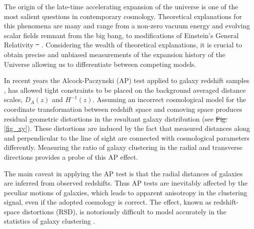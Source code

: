\documentclass[iop]{emulateapj}
\providecommand{\DIFadd}[1]{{\protect\color{blue}\uwave{#1}}} %
\providecommand{\DIFdel}[1]{{\protect\color{red}\sout{#1}}}                      %
\providecommand{\DIFaddbegin}{} %
\providecommand{\DIFaddend}{} %
\providecommand{\DIFdelbegin}{} %
\providecommand{\DIFdelend}{} %
\begin{document}
\DIFaddend The  origin  of  the late-time accelerating  expansion  of  the  universe  is  one of  the  most  salient  questions  in  contemporary cosmology. 
Theoretical explanations for this phenomena are many and range from a non-zero  vacuum energy and evolving  scalar  fields  remnant  from  the  big  bang, 
to modifications of Einstein's General Relativity \DIFdelbegin \DIFdel{\mbox{%
\cite{2012IJMPD..2130002Y}}%
}\DIFdelend \DIFaddbegin \DIFadd{\mbox{%
\citep{2012IJMPD..2130002Y}}%
}\DIFaddend . 
Considering the wealth of theoretical explanations, 
it is crucial to obtain precise and unbiased measurements of the expansion history of the Universe allowing us to 
differentiate between competing models. 

In recent years the Alcock-Paczynski (AP) test \citep{AP1979} applied to galaxy redshift samples \citep{Outram2004,Blake2011,Alam2016}, 
has allowed tight constraints to be placed on the background averaged distance scales, $D_A(z)$ and $H^{-1}(z)$.  
Assuming an incorrect cosmological model for the coordinate transformation between redshift space and comoving space
produces residual geometric distortions in the resultant galaxy distribution (see  \DIFdelbegin \DIFdel{Fig.}\DIFdelend \DIFaddbegin \DIFadd{Figure }\DIFaddend \ref{fig_xy}). 
These distortions are induced by the fact that measured distances along 
and perpendicular to the line of sight are connected with cosmological parameters differently. 
Measuring the ratio of galaxy clustering in the radial and transverse directions provides a probe of this AP effect.


The main caveat in applying the AP test is that 
the radial distances of galaxies are inferred from observed redshifts.
Thus AP tests are inevitably affected by the peculiar motions of galaxies,
which leads to apparent anisotropy in the clustering signal, even if the adopted cosmology is correct.
The effect, known as redshift-space distortions (RSD),
is notoriously difficult to model accurately in the statistics of galaxy clustering \citep{Ballinger1996}.
\end{document}
